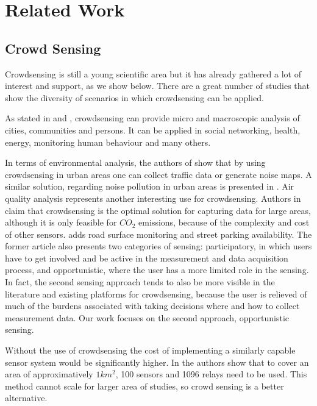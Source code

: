 \chapter{Related Work}
\label{chapter:related}


\section{Crowd Sensing}
\label{sec:related-crowd}
Crowdsensing is still a young scientific area but it has already gathered a lot of interest and support, as we show below. There are a great number of studies that show the diversity of scenarios in which crowdsensing can be applied.

As stated in \cite{lane2010survey} and \cite{khan2013mobile}, crowdsensing can provide micro and macroscopic analysis of cities, communities and persons. It can be applied in social networking, health, energy, monitoring human behaviour and many others.

In terms of environmental analysis, the authors of \cite{guo2014participatory} show that by using crowdsensing in urban areas one can collect traffic data or generate noise maps. A similar solution, regarding noise pollution in urban areas is presented in \cite{stevens2010crowdsourcing}. Air quality analysis represents another interesting use for crowdsensing. Authors in \cite{zheng2013u} claim that crowdsensing is the optimal solution for capturing data for large areas, although it is only feasible for \(CO_2\) emissions, because of the complexity and cost of other sensors. \cite{ma2014opportunities} adds road surface monitoring and street parking availability. The former article also presents two categories of sensing: participatory, in which users have to get involved and be active in the measurement and data acquisition process, and opportunistic, where the user has a more limited role in the sensing. In fact, the second sensing approach tends to also be more visible in the literature and existing platforms for crowdsensing, because the user is relieved of much of the burdens associated with taking decisions where and how to collect measurement data. Our work focuses on the second approach, opportunistic sensing.

Without the use of crowdsensing the cost of implementing a similarly capable sensor system would be significantly higher. In \cite{mao2012citysee} the authors show that to cover an area of approximatively $1km^2$, 100 sensors and 1096 relays need to be used. This method cannot scale for larger area of studies, so crowd sensing is a better alternative.

